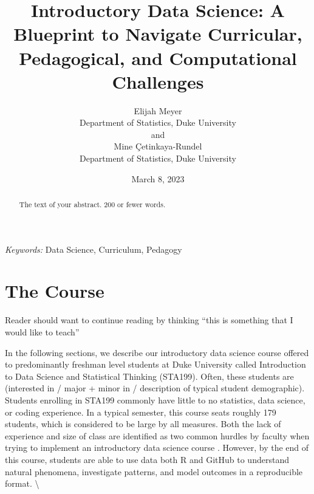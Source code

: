 \documentclass[
  12pt]{article}
\begin{document}
\def\spacingset#1{\renewcommand{\baselinestretch}%
{#1}\small\normalsize} \spacingset{1}



\date{March 8, 2023}
\title{\bf Introductory Data Science: A Blueprint to Navigate
Curricular, Pedagogical, and Computational Challenges}
\author{
Elijah Meyer\\
Department of Statistics, Duke University\\
and\\Mine Çetinkaya-Rundel\\
Department of Statistics, Duke University\\
}
\maketitle

\bigskip
\bigskip
\begin{abstract}
The text of your abstract. 200 or fewer words.
\end{abstract}

\noindent%
{\it Keywords:} Data Science, Curriculum, Pedagogy
\vfill

\newpage
\spacingset{1.9} %
\ifdefined\Shaded\renewenvironment{Shaded}{\begin{tcolorbox}[enhanced, breakable, frame hidden, boxrule=0pt, sharp corners, borderline west={3pt}{0pt}{shadecolor}, interior hidden]}{\end{tcolorbox}}\fi

\hypertarget{sec-course}{%
\section{The Course}\label{sec-course}}

Reader should want to continue reading by thinking ``this is something
that I would like to teach''

In the following sections, we describe our introductory data science
course offered to predominantly freshman level students at Duke
University called Introduction to Data Science and Statistical Thinking
(STA199). Often, these students are (interested in / major + minor in /
description of typical student demographic). Students enrolling in
STA199 commonly have little to no statistics, data science, or coding
experience. In a typical semester, this course seats roughly 179
students, which is considered to be large by all measures. Both the lack
of experience and size of class are identified as two common hurdles by
faculty when trying to implement an introductory data science course
\citep{Schwab2020, Kok_2008}. However, by the end of this course,
students are able to use data both R and GitHub to understand natural
phenomena, investigate patterns, and model outcomes in a reproducible
format. \textbackslash{}
\end{document}
